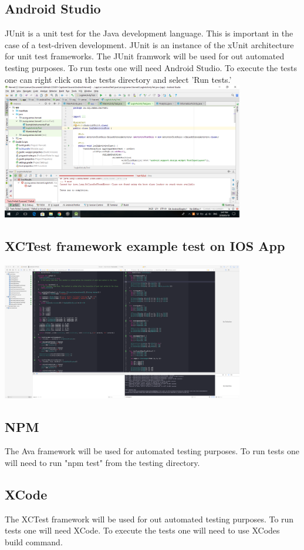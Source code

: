\documentclass[12pt]{article}
\begin{document}
  \subsection{Android Studio}
JUnit is a unit test for the Java development language. This is important in the case of a test-driven development. JUnit is an instance of the xUnit architecture for unit test frameworks. The JUnit framwork will be used for out automated testing purposes. To run tests one will need Android Studio. To execute the tests one can right click on the tests directory and select 'Run tests.'\newline
\includegraphics[width=400px]{images/FailedLoginTest}
\subsection{ XCTest framework example test on IOS App}
\includegraphics[width=400px]{images/iostest}

  \subsection{NPM}
  The Ava framework will be used for automated testing purposes. To run tests one will need to run "npm test" from the testing directory.
  \subsection{XCode}
  The XCTest framework will be used for out automated testing purposes. To run tests one will need XCode. To execute the tests one will need to use XCodes build command.
  
\end{document}
